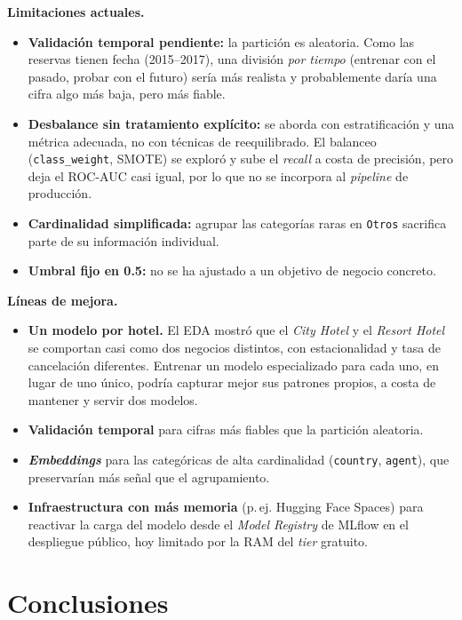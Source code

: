 \documentclass[10pt,twocolumn,a4paper]{article}
\newcommand{\var}[1]{\texttt{#1}}           %
\begin{document}
\textbf{Limitaciones actuales.}
\begin{itemize}
  \item \textbf{Validación temporal pendiente:} la partición es aleatoria. Como las
        reservas tienen fecha (2015--2017), una división \emph{por tiempo}
        (entrenar con el pasado, probar con el futuro) sería más realista y
        probablemente daría una cifra algo más baja, pero más fiable.
  \item \textbf{Desbalance sin tratamiento explícito:} se aborda con estratificación y
        una métrica adecuada, no con técnicas de reequilibrado. El balanceo
        (\var{class\_weight}, SMOTE) se exploró y sube el \emph{recall} a costa de
        precisión, pero deja el ROC-AUC casi igual, por lo que no se incorpora al
        \emph{pipeline} de producción.
  \item \textbf{Cardinalidad simplificada:} agrupar las categorías raras en
        \var{Otros} sacrifica parte de su información individual.
  \item \textbf{Umbral fijo en 0.5:} no se ha ajustado a un objetivo de negocio
        concreto.
\end{itemize}

\textbf{Líneas de mejora.}
\begin{itemize}
  \item \textbf{Un modelo por hotel.} El EDA mostró que el \emph{City Hotel} y el
        \emph{Resort Hotel} se comportan casi como dos negocios distintos, con
        estacionalidad y tasa de cancelación diferentes. Entrenar un modelo
        especializado para cada uno, en lugar de uno único, podría capturar mejor sus
        patrones propios, a costa de mantener y servir dos modelos.
  \item \textbf{Validación temporal} para cifras más fiables que la partición
        aleatoria.
  \item \textbf{\emph{Embeddings}} para las categóricas de alta cardinalidad
        (\var{country}, \var{agent}), que preservarían más señal que el agrupamiento.
  \item \textbf{Infraestructura con más memoria} (p.\,ej. Hugging Face Spaces) para
        reactivar la carga del modelo desde el \emph{Model Registry} de MLflow en el
        despliegue público, hoy limitado por la RAM del \emph{tier} gratuito.
\end{itemize}

\section{Conclusiones}
\end{document}
